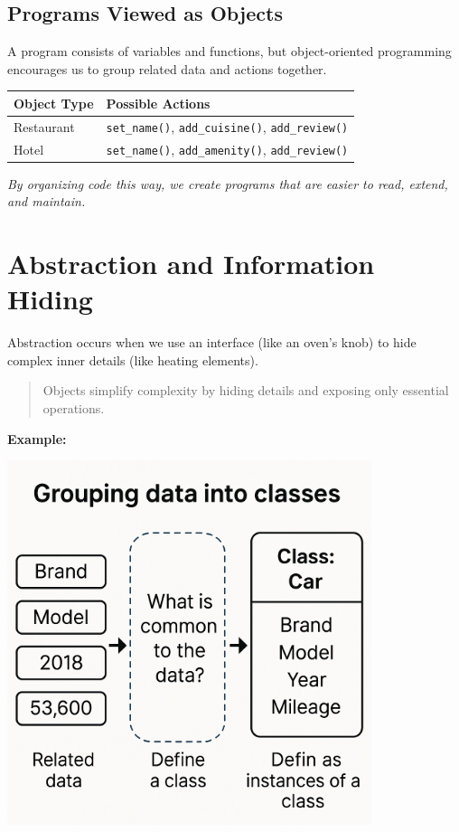 \subsection{Programs Viewed as Objects}

A program consists of variables and functions, but object-oriented programming encourages us to group related data and actions together.

\begin{center}
\begin{tabular}{|l|l|}
\hline
\textbf{Object Type} & \textbf{Possible Actions} \\
\hline
Restaurant & \texttt{set\_name()}, \texttt{add\_cuisine()}, \texttt{add\_review()} \\
Hotel & \texttt{set\_name()}, \texttt{add\_amenity()}, \texttt{add\_review()} \\
\hline
\end{tabular}
\end{center}

\noindent
\textit{By organizing code this way, we create programs that are easier to read, extend, and maintain.}

\section{Abstraction and Information Hiding}

Abstraction occurs when we use an interface (like an oven’s knob) to hide complex inner details (like heating elements).

\begin{quote}
Objects simplify complexity by hiding details and exposing only essential operations.
\end{quote}

\textbf{Example:}
\begin{center}
\includegraphics[width=0.8\textwidth]{../images/oven_abstraction_example.png}
\end{center}

